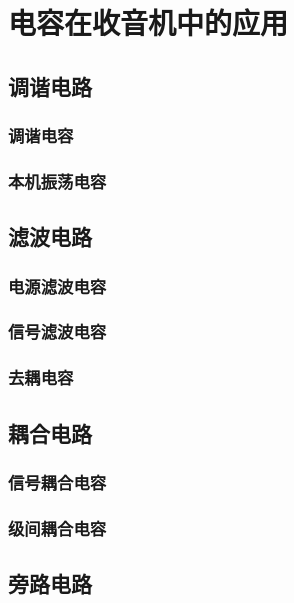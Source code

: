 \documentclass[12pt,UTF8]{ctexbook}
\begin{document}
\chapter{电容在收音机中的应用}

\section{调谐电路}

\subsection{调谐电容}

\subsection{本机振荡电容}

\section{滤波电路}

\subsection{电源滤波电容}

\subsection{信号滤波电容}

\subsection{去耦电容}

\section{耦合电路}

\subsection{信号耦合电容}

\subsection{级间耦合电容}

\section{旁路电路}
\end{document}
